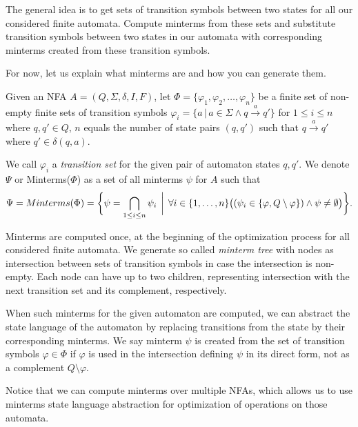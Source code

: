 The general idea is to get sets of transition symbols between two states for all our considered finite automata. Compute minterms from these sets and substitute transition symbols between two states in our automata with corresponding minterms created from these transition symbols.

For now, let us explain what minterms are and how you can generate them.

\begin{definition} \hfill \newline
Given an NFA $A = (Q, \Sigma, \delta, I, F)$, let $\Phi = \{ \varphi_1, \varphi_2, \ldots, \varphi_n \}$ be a finite set of non-empty finite sets of transition symbols $\varphi_i = \{ a \,\vert\, a \in \Sigma \land q \xrightarrow{a} q' \}$ for $ 1 \leq i \leq n$ where $q, q' \in Q$, $n$ equals the number of state pairs $(q, q')$ such that $q \xrightarrow{a} q'$ where $q' \in \delta(q, a)$.
\end{definition}

We call $\varphi_i$ a \emph{transition  set} for the given pair of automaton states $q, q'$. We denote $\Psi$ or Minterms($\Phi$) as a set of all minterms $\psi$ for $A$ such that
\[
    \Psi = Minterms(\Phi) = \biggl\{ \psi = \bigcap_{1 \leq i \leq n} \psi_i \,\biggm|\,
    \forall i \in \{1, \dots, n\} \bigl( (\psi_i \in \{ \varphi, Q \setminus \varphi \}) \land \psi \neq \emptyset \bigr) \biggr\} \text{.}
\]

Minterms are computed once, at the beginning of the optimization process for all considered finite automata. We generate so called \emph{minterm tree} with nodes as intersection between sets of transition symbols in case the intersection is non-empty. Each node can have up to two children, representing intersection with the next transition set and its complement, respectively.

When such minterms for the given automaton are computed, we can abstract the state language of the automaton by replacing transitions from the state by their corresponding minterms. We say minterm $\psi$ is created from the set of transition symbols $\varphi \in \Phi$ if $\varphi$ is used in the intersection defining $\psi$ in its direct form, not as a complement $Q \setminus \varphi$.

Notice that we can compute minterms over multiple NFAs, which allows us to use minterms state language abstraction for optimization of operations on those automata.

